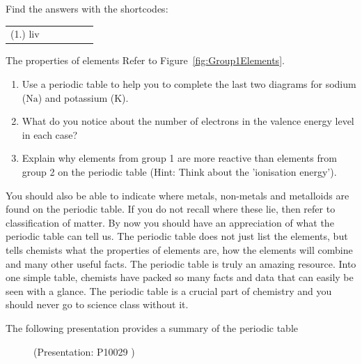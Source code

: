 

      \label{m38757*secfhsst!!!underscore!!!id936}
\par {} Find the answers with the shortcodes:
 \par \begin{tabular}[h]{cccccc}
 (1.) liv  & \end{tabular}
            

\begin{activity}{The properties of elements }
            \nopagebreak
            \label{m38757*uid798724}Refer to Figure~\ref{fig:Group1Elements}.
\label{m38757*id261630}\begin{enumerate}[noitemsep, label=\textbf{\arabic*}. ] 
            \label{m38757*uid136}\item Use a periodic table to help you to complete the last two diagrams for sodium ($\mathrm{Na}$) and potassium ($\mathrm{K}$).
\label{m38757*uid137}\item What do you notice about the number of electrons in the valence energy level in each case?
\label{m38757*uid138}\item Explain why elements from group 1 are more reactive than elements from group 2 on the periodic table (Hint: Think about the 'ionisation energy').
\end{enumerate}
        \par 
\label{m38757*eip-921}You should also be able to indicate where metals, non-metals and metalloids are found on the periodic table. If you do not recall where these lie, then refer to classification of matter. \label{m38757*eip-215}By now you should have an appreciation of what the periodic table can tell us. The periodic table does not just list the elements, but tells chemists what the properties of elements are, how the elements will combine and many other useful facts. The periodic table is truly an amazing resource. Into one simple table, chemists have packed so many facts and data that can easily be seen with a glance. The periodic table is a crucial part of chemistry and you should never go to science class without it. \label{m38757*eip-325}


The following presentation provides a summary of the periodic table
    \setcounter{subfigure}{0}
	\begin{figure}[H] %
    \label{m38757*slidesharemedia}\label{m38757*slideshareflash} { (Presentation:  P10029 )}
      \vspace{2pt}
    \vspace{.1in}
 \end{figure}       \par 
    \label{m38757*eip-572}

\end{activity}

